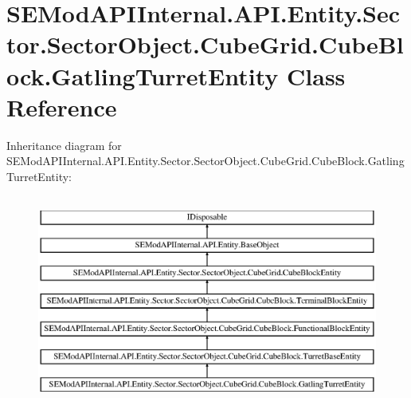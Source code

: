 \hypertarget{class_s_e_mod_a_p_i_internal_1_1_a_p_i_1_1_entity_1_1_sector_1_1_sector_object_1_1_cube_grid_1_199af756543e7cb8f4eabd4b9d47d9c9e}{}\section{S\+E\+Mod\+A\+P\+I\+Internal.\+A\+P\+I.\+Entity.\+Sector.\+Sector\+Object.\+Cube\+Grid.\+Cube\+Block.\+Gatling\+Turret\+Entity Class Reference}
\label{class_s_e_mod_a_p_i_internal_1_1_a_p_i_1_1_entity_1_1_sector_1_1_sector_object_1_1_cube_grid_1_199af756543e7cb8f4eabd4b9d47d9c9e}
Inheritance diagram for S\+E\+Mod\+A\+P\+I\+Internal.\+A\+P\+I.\+Entity.\+Sector.\+Sector\+Object.\+Cube\+Grid.\+Cube\+Block.\+Gatling\+Turret\+Entity\+:\begin{figure}[H]
\begin{center}
\leavevmode
\includegraphics[height=7.000000cm]{class_s_e_mod_a_p_i_internal_1_1_a_p_i_1_1_entity_1_1_sector_1_1_sector_object_1_1_cube_grid_1_199af756543e7cb8f4eabd4b9d47d9c9e}
\end{center}
\end{figure}
